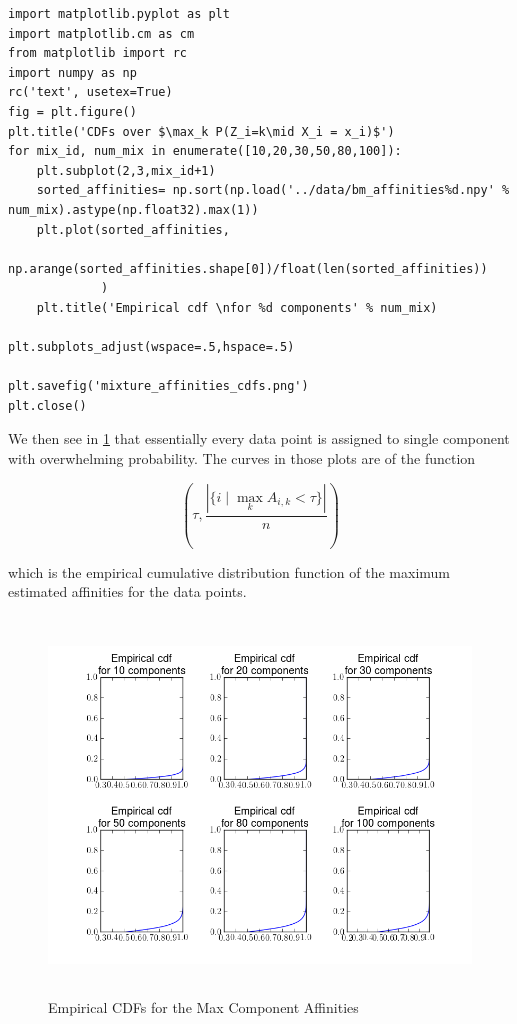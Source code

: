 \documentclass[11pt]{article}
\begin{document}
\begin{verbatim}
import matplotlib.pyplot as plt
import matplotlib.cm as cm
from matplotlib import rc
import numpy as np
rc('text', usetex=True)
fig = plt.figure()
plt.title('CDFs over $\max_k P(Z_i=k\mid X_i = x_i)$')
for mix_id, num_mix in enumerate([10,20,30,50,80,100]):
    plt.subplot(2,3,mix_id+1)
    sorted_affinities= np.sort(np.load('../data/bm_affinities%d.npy' % num_mix).astype(np.float32).max(1))
    plt.plot(sorted_affinities,
             np.arange(sorted_affinities.shape[0])/float(len(sorted_affinities))
             )
    plt.title('Empirical cdf \nfor %d components' % num_mix)

plt.subplots_adjust(wspace=.5,hspace=.5)

plt.savefig('mixture_affinities_cdfs.png')
plt.close()
\end{verbatim}



We then see in \ref{fig:mixture_affinities_cdfs} that essentially
every data point is assigned to single component with overwhelming
probability.  The curves in those plots are of the function

$$ \left( \tau,
          \frac{|\{i\mid \max_k A_{i,k} < \tau \}|}{n}\right)$$ 

which is the empirical cumulative distribution function of the maximum
estimated affinities for the data points.


\begin{figure}[htb]
\centering
\includegraphics[height=10cm]{./mixture_affinities_cdfs.png}
\caption{\label{fig:mixture_affinities_cdfs}Empirical CDFs for the Max Component Affinities}
\end{figure}
\end{document}
